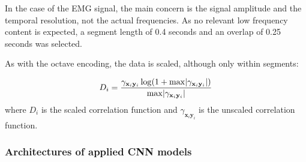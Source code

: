 In the case of the \ac{EMG} signal, the main concern is the signal amplitude and the temporal resolution, not the actual frequencies. As no relevant low frequency content is expected, a segment length of 0.4 seconds and an overlap of 0.25 seconds was selected.

As with the octave encoding, the data is scaled, although only within segments:

\begin{equation}
    D_i = \frac{ \gamma_{\mathbf{x}_i \mathbf{y}_i} \func{\log}{1 + \max \abs*{\gamma_{\mathbf{x}_i \mathbf{y}_i}}}}{\max \abs*{\gamma_{\mathbf{x}_i \mathbf{y}_i}}}
\end{equation}
where $D_i$ is the scaled correlation function and $\gamma_{\mathbf{x}_i \mathbf{y}_i}$ is the unscaled correlation function.

\subsubsection{Architectures of applied \ac{CNN} models}

